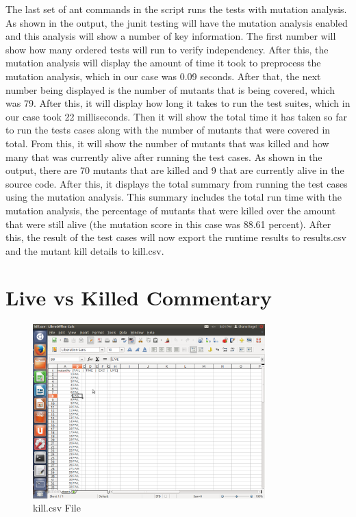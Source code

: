 \documentclass[12pt]{article}
\begin{document}
The last set of ant commands in the script runs the tests with mutation analysis. As shown in the output, the junit testing will have the mutation analysis enabled and this analysis will show a number of key information. The first number will show how many ordered tests will run to verify independency. After this, the mutation analysis will display the amount of time it took to preprocess the mutation analysis, which in our case was 0.09 seconds. After that, the next number being displayed is the number of mutants that is being covered, which was 79. After this, it will display how long it takes to run the test suites, which in our case took 22 milliseconds. Then it will show the total time it has taken so far to run the tests cases along with the number of mutants that were covered in total. From this, it will show the number of mutants that was killed and how many that was currently alive after running the test cases.  As shown in the output, there are 70 mutants that are killed and 9 that are currently alive in the source code. After this, it displays the total summary from running the test cases using the mutation analysis. This summary includes the total run time with the mutation analysis, the percentage of mutants that were killed over the amount that were still alive (the mutation score in this case was 88.61 percent). After this, the result of the test cases will now export the runtime results to results.csv and the mutant kill details to kill.csv. 

\vspace*{.1in}
\section{Live vs Killed Commentary}
\label{sec:seven}
\vspace*{-.1in}

\begin{figure}[p]
\centering
\includegraphics[width=0.8\textwidth]{Lab7Killcsv.png}
\caption{kill.csv File}
\label{fig:kill}
\end{figure}
\end{document}
